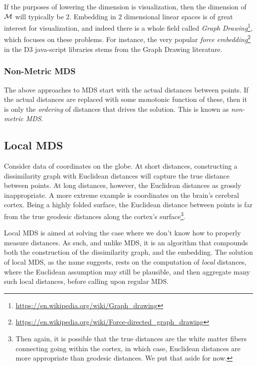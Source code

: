 \documentclass[12pt,a4paper]{article}
\begin{document}
\begin{remark}
	If the purposes of lowering the dimension is visualization, then the dimension of $\mathcal{M}$ will typically be $2$. 
	Embedding in $2$ dimensional linear spaces is of great interest for visualization, and indeed there is a whole field called \emph{Graph Drawing}\footnote{\url{https://en.wikipedia.org/wiki/Graph_drawing}}, which focuses on these problems.
	For instance, the very popular \emph{force embedding}\footnote{\url{https://en.wikipedia.org/wiki/Force-directed_graph_drawing}} in the D3 java-script libraries stems from the Graph Drawing literature. 
\end{remark}



\subsubsection{Non-Metric MDS}
The above approaches to MDS start with the actual distances between points. 
If the actual distances are replaced with some monotonic function of these, then it is only the \emph{ordering} of distances that drives the solution.
This is known as \emph{non-metric MDS}.





\subsection{Local MDS}
\label{sec:localMDS}

\begin{example}
\label{ex:non-euclidean}
	Consider data of coordinates on the globe. 
	At short distances, constructing a dissimilarity graph with Euclidean distances will capture the true distance between points. 
	At long distances, however, the Euclidean distances as grossly inappropriate. 
	A more extreme example is coordinates on the brain's cerebral cortex.
	Being a highly folded surface, the Euclidean distance between points is far from the true geodesic distances along the cortex's surface\footnote{Then again, it is possible that the true distances are the white matter fibers connecting going within the cortex, in which case, Euclidean distances are more appropriate than geodesic distances. We put that aside for now.}.
\end{example}

Local MDS is aimed at solving the case where we don't know how to properly measure distances. 
As such, and unlike MDS, it is an algorithm that compounds both the construction of the dissimilarity graph, and the embedding. 
The solution of local MDS, as the name suggests, rests on the computation of \emph{local} distances, where the Euclidean assumption may still be plausible, and then aggregate many such local distances, before calling upon regular MDS.
\end{document}
